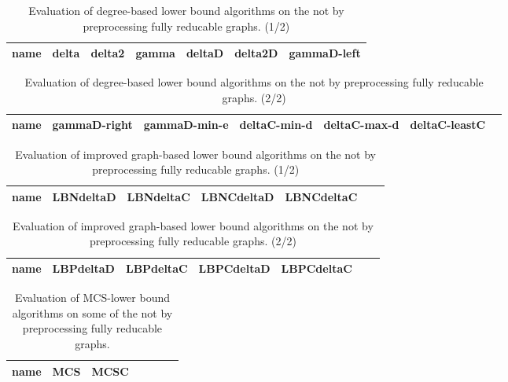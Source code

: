 \documentclass[a4wide]{article}
\begin{document}
\begin{table}[h!]
\small
\centering
\begin{tabular}{|l|l|l|l|l|l|l|}
\hline
name & delta & delta2 & gamma & deltaD & delta2D & gammaD-left \\
\hline
\hline

\hline
\end{tabular}
\caption{Evaluation of degree-based lower bound algorithms on the not by preprocessing fully reducable graphs. (1/2)}
\end{table}

\begin{table}[h!]
\small
\centering
\begin{tabular}{|l|l|l|l|l|l|l|}
\hline
name & gammaD-right & gammaD-min-e & deltaC-min-d & deltaC-max-d & deltaC-leastC \\
\hline
\hline

\hline
\end{tabular}
\caption{Evaluation of degree-based lower bound algorithms on the not by preprocessing fully reducable graphs. (2/2)}
\end{table}

\newpage

\begin{table}[h!]
\small
\centering
\begin{tabular}{|l|l|l|l|l|l|l|}
\hline
name & LBNdeltaD & LBNdeltaC & LBNCdeltaD & LBNCdeltaC \\
\hline
\hline

\hline
\end{tabular}
\caption{Evaluation of improved graph-based lower bound algorithms on the not by preprocessing fully reducable graphs. (1/2)}
\end{table}

\begin{table}[h!]
\small
\centering
\begin{tabular}{|l|l|l|l|l|l|l|}
\hline
name & LBPdeltaD & LBPdeltaC & LBPCdeltaD & LBPCdeltaC \\
\hline
\hline

\hline
\end{tabular}
\caption{Evaluation of improved graph-based lower bound algorithms on the not by preprocessing fully reducable graphs. (2/2)}
\end{table}

\newpage

\begin{table}[h!]
\small
\centering
\begin{tabular}{|l|l|l|l|l|l|l|}
\hline
name & MCS & MCSC \\
\hline
\hline

\hline
\end{tabular}
\caption{Evaluation of MCS-lower bound algorithms on some of the not by preprocessing fully reducable graphs.}
\end{table}
\end{document}
